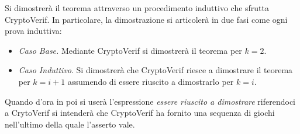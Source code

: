 \documentclass[a4paper,openright,twoside,12pt]{report}
\begin{document}
Si dimostrer\`a il teorema attraverso un procedimento induttivo che sfrutta CryptoVerif. 
In particolare, la dimostrazione si articoler\`a in due fasi come ogni prova induttiva:
\begin{itemize}
 \item \emph{Caso Base.} Mediante CryptoVerif si dimostrer\`a il teorema per $k=2$.
 \item \emph{Caso Induttivo}. Si dimostrer\`a che CryptoVerif riesce a dimostrare il teorema per $k=i+1$ assumendo di essere riuscito a dimostrarlo per $k=i$.
\end{itemize}


Quando d'ora in poi si user\`a l'espressione \emph{essere riuscito a dimostrare} riferendoci a CrytoVerif si intender\`a che CryptoVerif ha fornito una sequenza di giochi 
nell'ultimo della quale l'asserto vale.

\newpage
\end{document}
